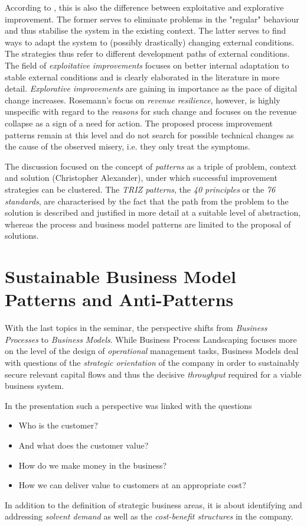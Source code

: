 \documentclass[11pt,a4paper]{article}
\begin{document}
According to \cite{Rosemann2020}, this is also the difference between
exploitative and explorative improvement. The former serves to eliminate
problems in the "regular" behaviour and thus stabilise the system in the
existing context. The latter serves to find ways to adapt the system to
(possibly drastically) changing external conditions. The strategies thus refer
to different development paths of external conditions. The field of
\emph{exploitative improvements} focuses on better internal adaptation to
stable external conditions and is clearly elaborated in the literature in more
detail. \emph{Explorative improvements} are gaining in importance as the pace
of digital change increases. Rosemann's focus on \emph{revenue resilience},
however, is highly unspecific with regard to the \emph{reasons} for such
change and focuses on the revenue collapse as a sign of a need for action. The
proposed process improvement patterns remain at this level and do not search
for possible technical changes as the cause of the observed misery, i.e. they
only treat the symptoms.

The discussion focused on the concept of \emph{patterns} as a triple of
problem, context and solution (Christopher Alexander), under which successful
improvement strategies can be clustered. The \emph{TRIZ patterns}, the
\emph{40 principles} or the \emph{76 standards}, are characterised by the fact
that the path from the problem to the solution is described and justified in
more detail at a suitable level of abstraction, whereas the process and
business model patterns are limited to the proposal of solutions.

\section{Sustainable Business Model Patterns and Anti-Patterns}

With the last topics in the seminar, the perspective shifts from
\emph{Business Processes} to \emph{Business Models}. While Business Process
Landscaping focuses more on the level of the design of \emph{operational}
management tasks, Business Models deal with questions of the \emph{strategic
  orientation} of the company in order to sustainably secure relevant capital
flows and thus the decisive \emph{throughput} required for a viable business
system.

In the presentation such a perspective was linked with the questions
\begin{itemize}
\item Who is the customer?
\item And what does the customer value?
\item How do we make money in the business?
\item How we can deliver value to customers at an appropriate cost?
\end{itemize}
In addition to the definition of strategic business areas, it is about
identifying and addressing \emph{solvent demand} as well as the
\emph{cost-benefit structures} in the company.
\end{document}
